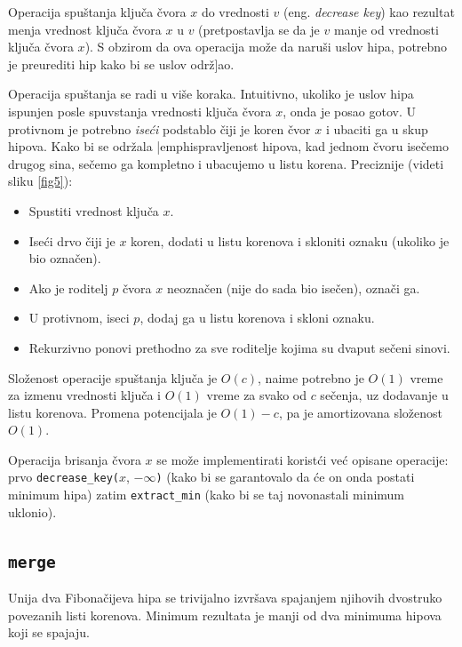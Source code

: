 \documentclass[a4paper]{article}
\theoremstyle{plain}
\theoremstyle{definition}
\begin{document}
Operacija spu\v{s}tanja klju\v{c}a \v{c}vora $x$ do vrednosti $v$ (eng. \emph{decrease key}) kao rezultat menja vrednost klju\v{c}a \v{c}vora $x$ u $v$ (pretpostavlja se da je $v$  manje od vrednosti klju\v{c}a \v{c}vora $x$). S obzirom da ova operacija mo\v{z}e da naru\v{s}i uslov hipa, potrebno je preurediti hip kako bi se uslov odr\v{z]ao}.

Operacija spu\v{s}tanja se radi u vi\v{s}e koraka. Intuitivno, ukoliko je uslov hipa ispunjen posle spuv{s}tanja vrednosti klju\v{c}a \v{c}vora $x$, onda je posao gotov. U protivnom je potrebno \emph{ise\'c{}i} podstablo \v{c}iji je koren \v{c}vor $x$ i ubaciti ga u skup hipova. Kako bi se odr\v{z}ala |emph{ispravljenost} hipova, kad jednom \v{c}voru ise\v{c}emo drugog sina, se\v{c}emo ga kompletno i ubacujemo u listu korena. Preciznije (videti sliku \ref{fig5}):
\begin{itemize}
    \item Spustiti vrednost klju\v{c}a $x$.
    \item Ise\'c{}i drvo \v{c}iji je $x$ koren, dodati u listu korenova i skloniti oznaku (ukoliko je bio ozna\v{c}en).
    \item Ako je roditelj $p$ \v{c}vora $x$ neozna\v{c}en (nije do sada bio ise\v{c}en), ozna\v{c}i ga.
    \item U protivnom, iseci $p$, dodaj ga u listu korenova i skloni oznaku.
    \item Rekurzivno ponovi prethodno za sve roditelje kojima su dvaput se\v{c}eni sinovi. 
\end{itemize}

Slo\v{z}enost operacije spu\v{s}tanja klju\v{c}a je $O(c)$, naime potrebno je $O(1)$ vreme za izmenu vrednosti klju\v{c}a i $O(1)$ vreme za svako od $c$ se\v{c}enja, uz dodavanje u listu korenova. Promena potencijala je $O(1) - c$, pa je amortizovana slo\v{z}enost $O(1)$.

Operacija brisanja \v{c}vora $x$ se mo\v{z}e implementirati korist\'c{}i ve\'c{} opisane operacije: prvo \texttt{decrease\_key(}$x$, $-\infty$\texttt{)}  (kako bi se garantovalo da \'c{}e on onda postati minimum hipa) zatim \texttt{extract\_min} (kako bi se taj novonastali minimum uklonio).

\subsection{\texttt{merge}}
\label{subsec:merge}

Unija dva Fibona\v{c}ijeva hipa se trivijalno izvr\v{s}ava spajanjem njihovih dvostruko povezanih listi korenova. Minimum rezultata je manji od dva minimuma hipova koji se spajaju.
\end{document}

